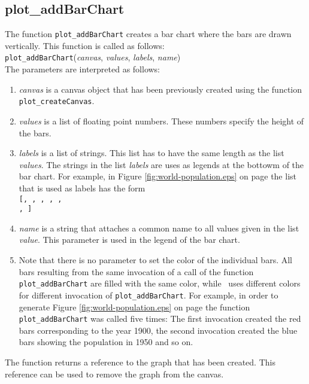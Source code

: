 \subsection{plot\_addBarChart}
The function \texttt{plot\_addBarChart} creates a bar chart where the bars are drawn vertically.
This function is called as follows:
\\[0.2cm]
\hspace*{1.3cm}
\texttt{plot\_addBarChart}(\textsl{canvas}, \textsl{values}, \textsl{labels}, \textsl{name})
\\[0.2cm]
The parameters are interpreted as follows:
\begin{enumerate}
\item \textsl{canvas} is a canvas object that has been previously created using the function
      \texttt{plot\_createCanvas}.  
\item \textsl{values} is a list of floating point numbers. These numbers specify the height of the
      bars.
\item \textsl{labels} is a list of strings.  This list has to have the same length as the list
      \textsl{values}.  The strings in the list \textsl{labels} are uses as legends at the bottowm
      of the bar chart.  For example, in Figure \ref{fig:world-population.eps} on page
      \pageref{fig:world-population.eps} the list that is used as labels has the form
      \\[0.2cm]
      \hspace*{1.3cm}
      \texttt{[, , , , , \\
        \hspace*{1.3cm} 
        , ]}
\item \textsl{name} is a string that attaches a common name to all values given in the list
      \textsl{value}.  This parameter is used in the legend of the bar chart.  
\item Note that there is no parameter to set the color of the individual bars.  All bars resulting
      from the same invocation of a call of the function \texttt{plot\_addBarChart} are filled with
      the same color, while \setlx\ uses different colors for different invocation of
      \texttt{plot\_addBarChart}.  For example, in order to generate Figure
      \ref{fig:world-population.eps} on page \pageref{fig:world-population.eps} the function 
      \texttt{plot\_addBarChart} was called five times: The first invocation created the red bars
      corresponding to the year 1900, the second invocation created the blue bars showing the
      population in 1950 and so on.
\end{enumerate}
The function returns a reference to the graph that has been created.  This reference can be used
to remove the graph from the canvas.

